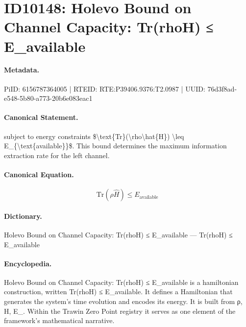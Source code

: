 \section*{ID10148: Holevo Bound on Channel Capacity: Tr(rhoH) ≤ E\_available}
\paragraph{Metadata.}
PiID: 6156787364005 | RTEID: RTE:P39406.9376:T2.0987 | UUID: 76d3f8ad-e548-5b80-a773-20b6e083eac1

\paragraph{Canonical Statement.}
subject to energy constraints \$\textbackslash{}text\{Tr\}(\textbackslash{}rho\textbackslash{}hat\{H\}) \textbackslash{}leq E\_\{\textbackslash{}text\{available\}\}\$. This bound determines the maximum information extraction rate for the left channel.

\paragraph{Canonical Equation.}
\[
\text{Tr}(\rho\hat{H}) \leq E_{\text{available}}
\]

\paragraph{Dictionary.}
Holevo Bound on Channel Capacity: Tr(rhoH) ≤ E\_available — Tr(rhoH) ≤ E\_available

\paragraph{Encyclopedia.}
Holevo Bound on Channel Capacity: Tr(rhoH) ≤ E\_available is a hamiltonian construction, written Tr(rhoH) ≤ E\_available. It defines a Hamiltonian that generates the system's time evolution and encodes its energy. It is built from ρ, H, E\_. Within the Trawin Zero Point registry it serves as one element of the framework's mathematical narrative.
